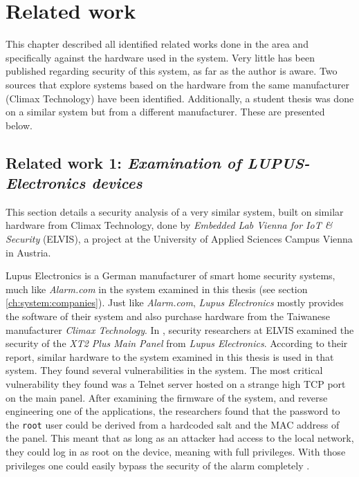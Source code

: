 \chapter{Related work} \label{ch:related-work}
This chapter described all identified related works done in the area and specifically against the hardware used in the system. Very little has been published regarding security of this system, as far as the author is aware. Two sources that explore systems based on the hardware from the same manufacturer (Climax Technology) have been identified. Additionally, a student thesis was done on a similar system but from a different manufacturer. These are presented below.

\section{Related work 1: \textit{Examination of LUPUS-Electronics devices}} \label{ch:related-work:lupus}
This section details a security analysis of a very similar system, built on similar hardware from Climax Technology, done by \textit{Embedded Lab Vienna for IoT \& Security} (ELVIS), a project at the University of Applied Sciences Campus Vienna in Austria.

Lupus Electronics is a German manufacturer of smart home security systems, much like \textit{Alarm.com} in the system examined in this thesis (see section \ref{ch:system:companies}). Just like \textit{Alarm.com}, \textit{Lupus Electronics} mostly provides the software of their system and also purchase hardware from the Taiwanese manufacturer \textit{Climax Technology}. In \citeyear{labvienna}, security researchers at ELVIS examined the security of the \textit{XT2 Plus Main Panel} from \textit{Lupus Electronics}. According to their report, similar hardware to the system examined in this thesis is used in that system. They found several vulnerabilities in the system. The most critical vulnerability they found was a Telnet server hosted on a strange high TCP port on the main panel. After examining the firmware of the system, and reverse engineering one of the applications, the researchers found that the password to the \texttt{root} user could be derived from a hardcoded salt and the MAC address of the panel. This meant that as long as an attacker had access to the local network, they could log in as root on the device, meaning with full privileges. With those privileges one could easily bypass the security of the alarm completely \citeyear{labvienna}.


